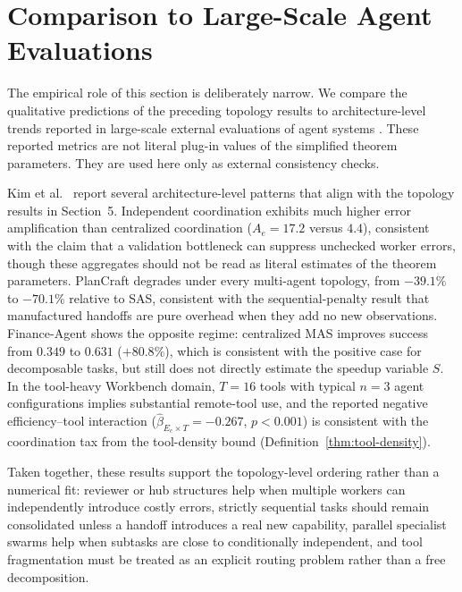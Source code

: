 \section{Comparison to Large-Scale Agent Evaluations}

The empirical role of this section is deliberately narrow. We compare the qualitative predictions of the
preceding topology results to architecture-level trends reported in large-scale external evaluations of
agent systems \cite{kim2025scaling}. These reported metrics are not literal plug-in values of the
simplified theorem parameters. They are used here only as external consistency checks.

Kim et al.~\cite{kim2025scaling} report several architecture-level patterns that align with the topology
results in Section~5. Independent coordination exhibits much higher error amplification than centralized
coordination ($A_e = 17.2$ versus $4.4$), consistent with the claim that a validation bottleneck can
suppress unchecked worker errors, though these aggregates should not be read as literal estimates of the
theorem parameters. PlanCraft degrades under every multi-agent topology, from $-39.1\%$ to $-70.1\%$
relative to SAS, consistent with the sequential-penalty result that manufactured handoffs are pure
overhead when they add no new observations. Finance-Agent shows the opposite regime: centralized MAS
improves success from $0.349$ to $0.631$ ($+80.8\%$), which is consistent with the positive case for
decomposable tasks, but still does not directly estimate the speedup variable $S$. In the tool-heavy
Workbench domain, $T=16$ tools with typical $n=3$ agent configurations implies substantial remote-tool
use, and the reported negative efficiency--tool interaction
($\hat{\beta}_{E_c \times T} = -0.267$, $p < 0.001$) is consistent with the coordination tax from
the tool-density bound (Definition~\ref{thm:tool-density}).

Taken together, these results support the topology-level ordering rather than a numerical fit: reviewer
or hub structures help when multiple workers can independently introduce costly errors, strictly
sequential tasks should remain consolidated unless a handoff introduces a real new capability, parallel
specialist swarms help when subtasks are close to conditionally independent, and tool fragmentation must
be treated as an explicit routing problem rather than a free decomposition.

